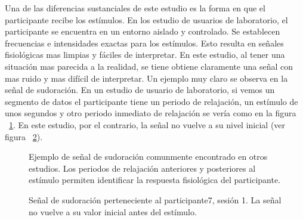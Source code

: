 Una de las diferencias sustanciales de este estudio es la forma en que el participante recibe los est\'imulos. En los estudio de usuarios de laboratorio, el participante se encuentra en un entorno aislado y controlado. Se establecen frecuencias e intensidades exactas para los est\'imulos. Esto resulta en se\~nales fisiol\'ogicas mas limpias y f\'aciles de interpretar. En este estudio, al tener una situaci\'on mas parecida a la realidad, se tiene obtiene claramente una se\~nal con mas ruido y mas dif\'icil de interpretar. Un ejemplo muy claro se observa en la se\~nal de sudoraci\'on. En un estudio de usuario de laboratorio, si vemos un segmento de datos el participante tiene un periodo de relajaci\'on, un est\'imulo de unos segundos y otro periodo inmediato de relajaci\'on se ver\'ia como en la figura ~\ref{fig:gsrsynth}. En este estudio, por el contrario, la se\~nal no vuelve a su nivel inicial (ver figura ~\ref{fig:gsrstudy}). %

\begin{figure}[h!]
        \centering
        \caption{Ejemplo de se\~nal de sudoraci\'on comunmente encontrado en otros estudios. Los periodos de relajaci\'on anteriores y posteriores al est\'imulo permiten identificar la respuesta fisiol\'ogica del participante.}\label{fig:gsrsynth}
\end{figure}
\begin{figure}[h!]
        \centering
        \caption{Se\~nal de sudoraci\'on perteneciente al participante7, sesi\'on 1. La se\~nal no vuelve a su valor inicial antes del est\'imulo.}\label{fig:gsrstudy}
\end{figure}

